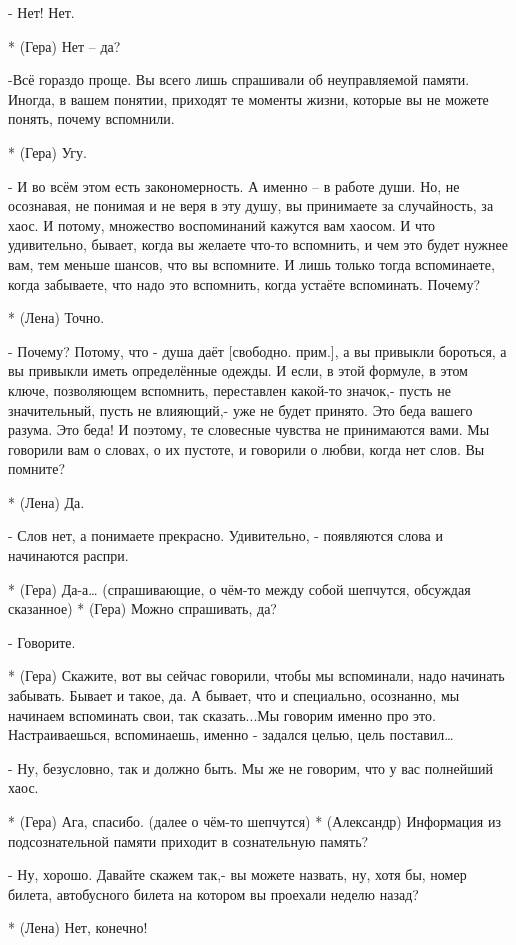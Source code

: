 - Нет! Нет. 

* (Гера) Нет – да?

-Всё гораздо проще. Вы всего лишь спрашивали об неуправляемой памяти. Иногда, в вашем понятии, приходят те моменты жизни, которые вы не можете понять, почему вспомнили.

* (Гера) Угу.

- И во всём этом есть закономерность. А именно – в работе души. Но, не осознавая, не понимая и не веря в эту душу, вы принимаете за случайность, за хаос. И потому,  множество воспоминаний кажутся вам хаосом. И что удивительно, бывает, когда вы желаете что-то вспомнить, и чем это будет нужнее вам, тем меньше шансов, что вы вспомните. И лишь только тогда вспоминаете, когда забываете, что надо это вспомнить, когда устаёте вспоминать. Почему?

* (Лена) Точно.

- Почему? Потому, что - душа даёт [свободно. прим.], а вы привыкли бороться, а вы привыкли иметь определённые одежды. И если, в этой формуле, в этом ключе, позволяющем вспомнить, переставлен какой-то значок,- пусть не значительный, пусть не влияющий,- уже не будет принято. Это беда вашего разума. Это беда! И поэтому, те словесные чувства не принимаются вами. Мы говорили вам о словах, о их пустоте, и говорили о любви, когда нет слов. Вы помните?

* (Лена) Да.

- Слов нет, а понимаете прекрасно. Удивительно, -  появляются слова и начинаются распри.

* (Гера) Да-а…
(спрашивающие, о чём-то между собой шепчутся, обсуждая сказанное)
* (Гера) Можно спрашивать, да?

- Говорите.

* (Гера) Скажите, вот вы сейчас говорили, чтобы мы вспоминали, надо начинать забывать. Бывает и такое, да. А бывает, что и специально, осознанно, мы начинаем вспоминать свои, так сказать...Мы говорим именно про это. Настраиваешься, вспоминаешь, именно - задался целью, цель поставил…

- Ну, безусловно, так и должно быть. Мы же не говорим, что у вас полнейший хаос.

* (Гера) Ага, спасибо. (далее о чём-то шепчутся)
* (Александр) Информация из подсознательной памяти приходит в сознательную память?

- Ну, хорошо. Давайте скажем так,- вы можете назвать, ну, хотя бы, номер билета, автобусного билета на котором вы проехали неделю назад?

* (Лена) Нет, конечно!

